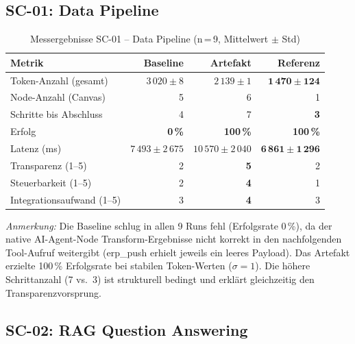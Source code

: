 \documentclass[12pt,a4paper,oneside]{report}
\begin{document}
\subsection{SC-01: Data Pipeline}

\begin{table}[H]
  \centering
  \caption{Messergebnisse SC-01 -- Data Pipeline (n\,=\,9, Mittelwert $\pm$ Std)}
  \label{tab:results-sc01}
  \begin{tabular}{lrrr}
    \toprule
    \textbf{Metrik} & \textbf{Baseline} & \textbf{Artefakt} & \textbf{Referenz} \\
    \midrule
    Token-Anzahl (gesamt)      & $3\,020 \pm 8$           & $2\,139 \pm 1$            & $\mathbf{1\,470 \pm 124}$ \\
    Node-Anzahl (Canvas)       & 5                        & 6                         & 1 \\
    Schritte bis Abschluss     & 4                        & 7                         & \textbf{3} \\
    Erfolg                     & \textbf{0\,\%}           & \textbf{100\,\%}          & \textbf{100\,\%} \\
    Latenz (ms)                & $7\,493 \pm 2\,675$      & $10\,570 \pm 2\,040$      & $\mathbf{6\,861 \pm 1\,296}$ \\
    Transparenz (1--5)         & 2                        & \textbf{5}                & 2 \\
    Steuerbarkeit (1--5)       & 2                        & \textbf{4}                & 1 \\
    Integrationsaufwand (1--5) & 3                        & \textbf{4}                & 3 \\
    \bottomrule
  \end{tabular}
\end{table}

\noindent\textit{Anmerkung:} Die Baseline schlug in allen 9 Runs fehl (Erfolgsrate 0\,\%),
da der native AI-Agent-Node Transform-Ergebnisse nicht korrekt in den nachfolgenden
Tool-Aufruf weitergibt (erp\_push erhielt jeweils ein leeres Payload). Das Artefakt
erzielte 100\,\% Erfolgsrate bei stabilen Token-Werten ($\sigma = 1$). Die höhere
Schritt\-anzahl (7 vs.\ 3) ist strukturell bedingt und erklärt gleichzeitig den
Transparenzvorsprung.

\subsection{SC-02: RAG Question Answering}
\end{document}
